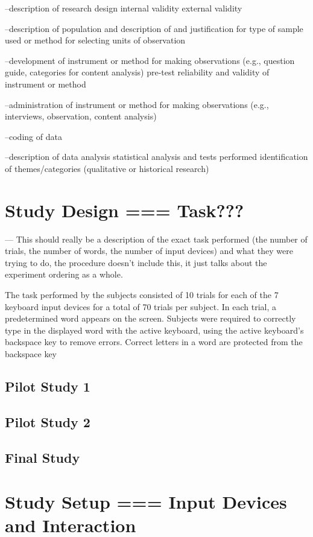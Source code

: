 --description of research design
 internal validity
 external validity

--description of population and description of and justification for type of sample used or method for
selecting units of observation

--development of instrument or method for making observations (e.g., question guide, categories for content
analysis)
 pre-test
 reliability and validity of instrument or method

--administration of instrument or method for making observations (e.g., interviews, observation, content
analysis)

--coding of data

--description of data analysis
 statistical analysis and tests performed
 identification of themes/categories (qualitative or historical research) 

\section{Study Design === Task???}

--- This should really be a description of the exact task performed (the number of trials, the number of words, the number of input devices) and what they were trying to do, the procedure doesn't include this, it just talks about the experiment ordering as a whole.

The task performed by the subjects consisted of 10 trials for each of the 7 keyboard input devices for a total of 70 trials per subject. In each trial, a predetermined word appears on the screen. Subjects were required to correctly type in the displayed word with the active keyboard, using the active keyboard's backspace key to remove errors. Correct letters in a word are protected from the backspace key 

\subsection{Pilot Study 1}

\subsection{Pilot Study 2}

\subsection{Final Study}

\section{Study Setup === Input Devices and Interaction}

